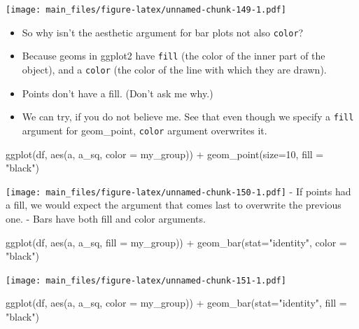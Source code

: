 \documentclass[
]{book}
\newenvironment{Shaded}{\begin{snugshade}}{\end{snugshade}}
\newcommand{\AttributeTok}[1]{\textcolor[rgb]{0.77,0.63,0.00}{#1}}
\newcommand{\DecValTok}[1]{\textcolor[rgb]{0.00,0.00,0.81}{#1}}
\newcommand{\FunctionTok}[1]{\textcolor[rgb]{0.00,0.00,0.00}{#1}}
\newcommand{\NormalTok}[1]{#1}
\newcommand{\SpecialCharTok}[1]{\textcolor[rgb]{0.00,0.00,0.00}{#1}}
\newcommand{\StringTok}[1]{\textcolor[rgb]{0.31,0.60,0.02}{#1}}
\begin{document}
\texttt{[image: main\_files/figure-latex/unnamed-chunk-149-1.pdf]}

\begin{itemize}
\item
  So why isn't the aesthetic argument for bar plots not also \texttt{color}?
\item
  Because geoms in ggplot2 have \texttt{fill} (the color of the inner part of the object), and a \texttt{color} (the color of the line with which they are drawn).
\item
  Points don't have a fill. (Don't ask me why.)
\item
  We can try, if you do not believe me. See that even though we specify a \texttt{fill} argument for geom\_point, \texttt{color} argument overwrites it.
\end{itemize}

\begin{Shaded}
\begin{Highlighting}[]
\FunctionTok{ggplot}\NormalTok{(df, }\FunctionTok{aes}\NormalTok{(a, a\_sq, }\AttributeTok{color =}\NormalTok{ my\_group)) }\SpecialCharTok{+} \FunctionTok{geom\_point}\NormalTok{(}\AttributeTok{size=}\DecValTok{10}\NormalTok{, }\AttributeTok{fill =} \StringTok{"black"}\NormalTok{)}
\end{Highlighting}
\end{Shaded}

\texttt{[image: main\_files/figure-latex/unnamed-chunk-150-1.pdf]}
- If points had a fill, we would expect the argument that comes last to overwrite the previous one.
- Bars have both fill and color arguments.

\begin{Shaded}
\begin{Highlighting}[]
\FunctionTok{ggplot}\NormalTok{(df, }\FunctionTok{aes}\NormalTok{(a, a\_sq, }\AttributeTok{fill =}\NormalTok{ my\_group)) }\SpecialCharTok{+} \FunctionTok{geom\_bar}\NormalTok{(}\AttributeTok{stat=}\StringTok{"identity"}\NormalTok{, }\AttributeTok{color =} \StringTok{"black"}\NormalTok{)}
\end{Highlighting}
\end{Shaded}

\texttt{[image: main\_files/figure-latex/unnamed-chunk-151-1.pdf]}

\begin{Shaded}
\begin{Highlighting}[]
\FunctionTok{ggplot}\NormalTok{(df, }\FunctionTok{aes}\NormalTok{(a, a\_sq, }\AttributeTok{color =}\NormalTok{ my\_group)) }\SpecialCharTok{+} \FunctionTok{geom\_bar}\NormalTok{(}\AttributeTok{stat=}\StringTok{"identity"}\NormalTok{, }\AttributeTok{fill =} \StringTok{"black"}\NormalTok{)}
\end{Highlighting}
\end{Shaded}
\end{document}
